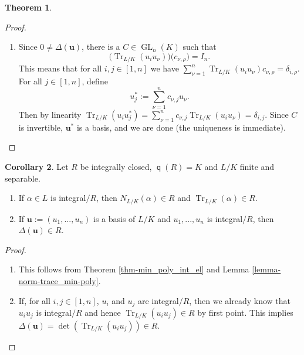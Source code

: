 \documentclass[12pt,a4paper]{report}
\theoremstyle{definition}
\newtheorem{theorem}{Theorem}[chapter] %
\newtheorem{corollary}[theorem]{Corollary} %
\theoremstyle{num.custom-title}
\DeclareMathOperator{\Tr}{Tr}
\DeclareMathOperator{\q}{\mathsf{q}}
\DeclareMathOperator{\GL}{GL}
\renewcommand{\u}{\mathbf{u}}
\begin{document}
\begin{theorem}
\begin{proof}
\begin{enumerate}
\item Since $0 \neq \Delta(\u)$, there is a $C \in \GL_n(K)$ such that
\[
\Big( \Tr_{L/K} (u_i u_\nu) \Big) \Big( c_{\nu,\rho} \Big) = I_n.
\]
This means that for all $i,j \in [1,n]$ we have $\sum_{\nu=1}^n \Tr_{L/K} (u_i u_\nu) c_{\nu,\rho} = \delta_{i,\rho}$. For all $j \in [1,n]$, define
\[
u_j^* := \sum_{\nu=1}^n c_{\nu,j} u_\nu.
\]
Then by linearity $\Tr_{L/K}(u_i u_j^*) = \sum_{\nu=1}^n c_{\nu,j} \Tr_{L/K} (u_i u_\nu) = \delta_{i,j}$. Since $C$ is invertible, $\u^*$ is a basis, and we are done (the uniqueness is immediate).
\end{enumerate}
\end{proof}
\end{theorem}

\begin{corollary}\label{corollary_norm-trace-integral-el}
Let $R$ be integrally closed, $\q(R)=K$ and $L/K$ finite and separable.
\begin{enumerate}
\item If $\alpha \in L$ is integral$/R$, then $N_{L/K}(\alpha) \in R$ and $\Tr_{L/K}(\alpha) \in R$.
\item If $\u := (u_1,...,u_n)$ is a basis of $L/K$ and $u_1,...,u_n$ is integral$/R$, then $\Delta(\u) \in R$.
\end{enumerate}
\begin{proof}\ 
\begin{enumerate}
\item This follows from Theorem \ref{thm-min_poly_int_el} and Lemma \ref{lemma-norm-trace_min-poly}.
\item If, for all $i,j \in [1,n]$, $u_i$ and $u_j$ are integral$/R$, then we already know that $u_i u_j$ is integral$/R$ and hence $\Tr_{L/K}(u_i u_j) \in R$ by first point. This implies $\Delta(\u) = \det(\Tr_{L/K}(u_i u_j)) \in R$.
\end{enumerate}
\end{proof}
\end{corollary}
\end{document}
